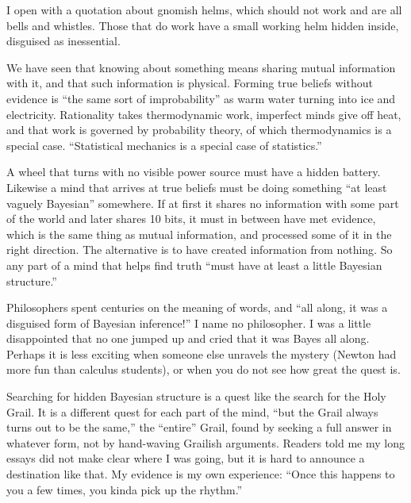 
I open with a quotation about gnomish helms, which should not work and are all bells and whistles. Those that do work have a small working helm hidden inside, disguised as inessential.

We have seen that knowing about something means sharing mutual information with it, and that such information is physical. Forming true beliefs without evidence is ``the same sort of improbability'' as warm water turning into ice and electricity. Rationality takes thermodynamic work, imperfect minds give off heat, and that work is governed by probability theory, of which thermodynamics is a special case. ``Statistical mechanics is a special case of statistics.'' 

A wheel that turns with no visible power source must have a hidden battery. Likewise a mind that arrives at true beliefs must be doing something ``at least vaguely Bayesian'' somewhere. If at first it shares no information with some part of the world and later shares 10 bits, it must in between have met evidence, which is the same thing as mutual information, and processed some of it in the right direction. The alternative is to have created information from nothing. So any part of a mind that helps find truth ``must have at least a little Bayesian structure.'' 

Philosophers spent centuries on the meaning of words, and ``all along, it was a disguised form of Bayesian inference!'' I name no philosopher. I was a little disappointed that no one jumped up and cried that it was Bayes all along. Perhaps it is less exciting when someone else unravels the mystery (Newton had more fun than calculus students), or when you do not see how great the quest is.

Searching for hidden Bayesian structure is a quest like the search for the Holy Grail. It is a different quest for each part of the mind, ``but the Grail always turns out to be the same,'' the ``entire'' Grail, found by seeking a full answer in whatever form, not by hand-waving Grailish arguments. Readers told me my long essays did not make clear where I was going, but it is hard to announce a destination like that. My evidence is my own experience: ``Once this happens to you a few times, you kinda pick up the rhythm.'' 

